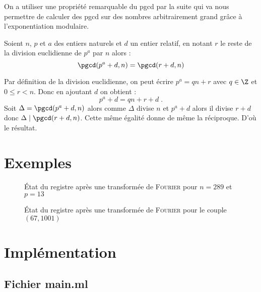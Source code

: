 \documentclass[a4paper,11pt]{tipe}
\begin{document}
On a utiliser une propriété remarquable du pgcd par la suite qui va nous
permettre de calculer des pgcd sur des nombres arbitrairement grand grâce à
l'exponentiation modulaire.
\begin{propriete}
Soient $n$, $p$ et $a$ des entiers naturels et $d$ un entier relatif, en
notant $r$ le reste de la division euclidienne de $p ^ a$ par $n$ alors :
\[ \pgcd( p ^ a + d, n) = \pgcd( r + d, n) \]
\end{propriete}
\begin{demonstration}
Par définition de la division euclidienne, on peut écrire $p ^ a = q n + r$
avec $q \in \Z$ et $ 0 \leq r < n$. Donc en ajoutant $d$ on obtient :
\[ p ^ a + d = q n + r + d \; .\]
Soit $\Delta = \pgcd( p ^ a + d, n)$ alors comme $\Delta$ divise $n$ et $p^a
+d$ alors il divise $r + d$ donc $\Delta \mid \pgcd(r+d,n)$. 
Cette même égalité donne de même la réciproque. D'où le résultat.
\end{demonstration}


\chapter{Exemples}

\begin{figure}
  
%  
  \caption{État du registre après une transformée de \textsc{Fourier} pour $n =
289$ et $p = 13$}
\end{figure}
\begin{figure}
% 
 \caption{État du registre après une transformée de \textsc{Fourier} pour le
couple $(67,1001)$}
\end{figure}

%

\appendix
\chapter{Implémentation}
\section{Fichier main.ml}
\end{document}
